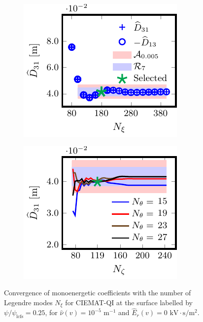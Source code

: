 \documentclass[10pt]{iopart}
\begin{document}
\begin{figure}[t]
	\begin{subfigure}[t]{0.32\textwidth}
		\includegraphics{Convergence-Legendre-CIEMAT-QI-s0250-Er-0-D31-Detail}
%		
		\caption{}
		\label{subfig:D31_convergence_Legendre_CIEMAT_QI_0250_Erho_0_Detail}
	\end{subfigure}
	\begin{subfigure}[t]{0.32\textwidth}
		\includegraphics{Convergence-theta-zeta-CIEMAT-QI-s0250-Er-0-D31}
%			
        \caption{}
        \label{subfig:D31_convergence_theta_zeta_CIEMAT_QI_0250_Erho_0}
	\end{subfigure}
	
	
	
	\caption{Convergence of monoenergetic coefficients with the number of Legendre modes $N_\xi$ for CIEMAT-QI at the surface labelled by $\psi/\psi_{\text{lcfs}}=0.25$, for $\hat{\nu}(v)=10^{-5}$ $\text{m}^{-1}$ and $\widehat{E}_r(v)=0$ $\text{kV}\cdot\text{s}/\text{m}^2$.}
	\label{fig:Convergence_CIEMAT_QI_Er_0}
\end{figure}
\end{document}
